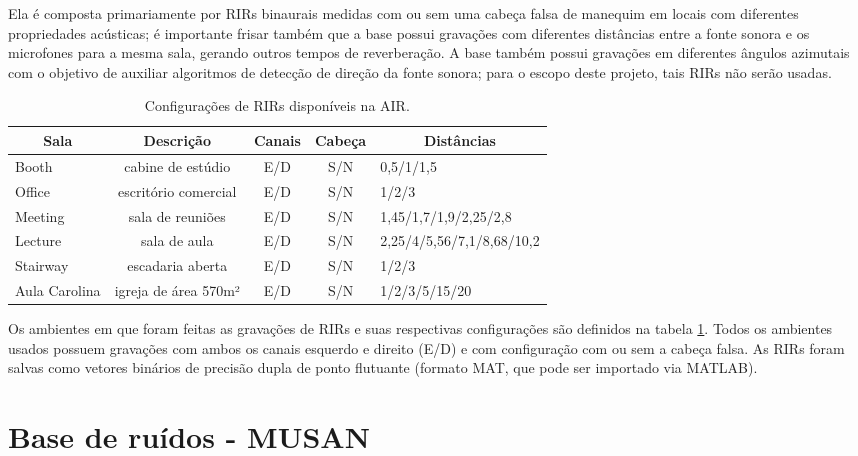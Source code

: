 Ela é composta primariamente por RIRs binaurais medidas com ou sem uma cabeça falsa de manequim em locais com diferentes
propriedades acústicas; é importante frisar também que a base possui gravações com diferentes distâncias entre a fonte sonora
e os microfones para a mesma sala, gerando outros tempos de reverberação.
A base também possui gravações em diferentes ângulos azimutais com o objetivo de auxiliar algoritmos de detecção
de direção da fonte sonora; para o escopo deste projeto, tais RIRs não serão usadas. 

\begin{table} [H]
    \centering
    \caption{Configurações de RIRs disponíveis na AIR.}
    \label{tbl:rir}
    \begin{tabularx}{\textwidth}{l|c|c|c|l}
        
        \multicolumn{1}{c|}{\textbf{Sala}} & \multicolumn{1}{c|}{\textbf{Descrição}} & \multicolumn{1}{|c|}{\textbf{Canais}} &
        \multicolumn{1}{|c|}{\textbf{Cabeça}} & \multicolumn{1}{c}{\textbf{Distâncias}} \\
        \hline 

        Booth & cabine de estúdio & E/D & S/N & 0,5/1/1,5 \\
        Office & escritório comercial & E/D & S/N & 1/2/3 \\
        Meeting & sala de reuniões & E/D & S/N & 1,45/1,7/1,9/2,25/2,8 \\
        Lecture & sala de aula & E/D & S/N & 2,25/4/5,56/7,1/8,68/10,2 \\
        Stairway & escadaria aberta & E/D & S/N & 1/2/3 \\
        Aula Carolina & igreja de área 570m² & E/D & S/N & 1/2/3/5/15/20 

    \end{tabularx}
\end{table}

Os ambientes em que foram feitas as gravações de RIRs e suas respectivas configurações são definidos na tabela \ref{tbl:rir}.
Todos os ambientes usados possuem gravações com ambos os canais esquerdo e direito (E/D) e com configuração com ou sem a cabeça
falsa. As RIRs foram salvas como vetores binários de precisão dupla de ponto flutuante (formato MAT, que pode ser importado
via MATLAB\textregistered).

\section{Base de ruídos - MUSAN}

